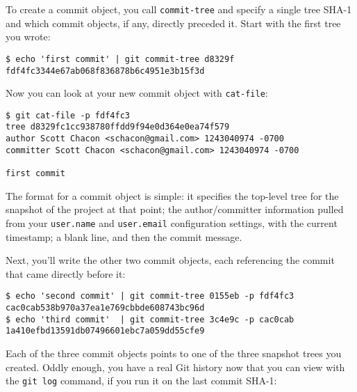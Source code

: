 \documentclass[a4paper]{book}
\begin{document}
To create a commit object, you call \texttt{commit-tree} and specify a single tree SHA-1 and which commit objects, if any, directly preceded it. Start with the first tree you wrote:

\begin{shaded}\begin{verbatim}
$ echo 'first commit' | git commit-tree d8329f
fdf4fc3344e67ab068f836878b6c4951e3b15f3d
\end{verbatim}\end{shaded}

Now you can look at your new commit object with \texttt{cat-file}:

\begin{shaded}\begin{verbatim}
$ git cat-file -p fdf4fc3
tree d8329fc1cc938780ffdd9f94e0d364e0ea74f579
author Scott Chacon <schacon@gmail.com> 1243040974 -0700
committer Scott Chacon <schacon@gmail.com> 1243040974 -0700

first commit
\end{verbatim}\end{shaded}

The format for a commit object is simple: it specifies the top-level tree for the snapshot of the project at that point; the author/committer information pulled from your \texttt{user.name} and \texttt{user.email} configuration settings, with the current timestamp; a blank line, and then the commit message.

Next, you'll write the other two commit objects, each referencing the commit that came directly before it:

\begin{shaded}\begin{verbatim}
$ echo 'second commit' | git commit-tree 0155eb -p fdf4fc3
cac0cab538b970a37ea1e769cbbde608743bc96d
$ echo 'third commit'  | git commit-tree 3c4e9c -p cac0cab
1a410efbd13591db07496601ebc7a059dd55cfe9
\end{verbatim}\end{shaded}

Each of the three commit objects points to one of the three snapshot trees you created. Oddly enough, you have a real Git history now that you can view with the \texttt{git log} command, if you run it on the last commit SHA-1:
\end{document}
